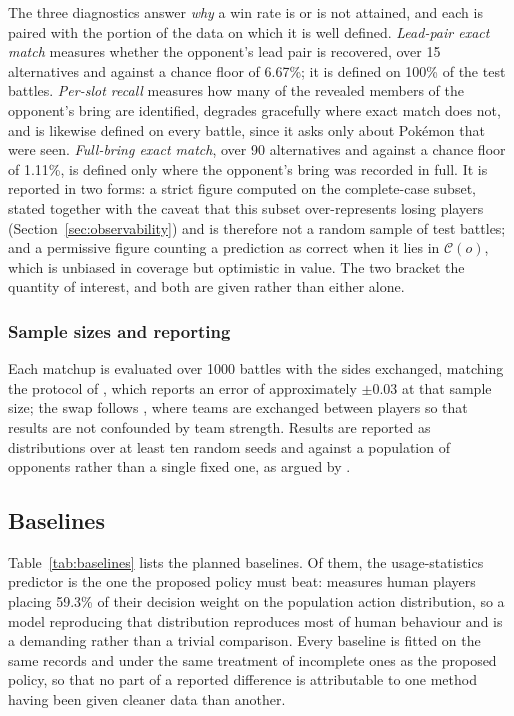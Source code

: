 \documentclass[conference]{IEEEtran}
\begin{document}
The three diagnostics answer \emph{why} a win rate is or is not attained, and
each is paired with the portion of the data on which it is well defined.
\emph{Lead-pair exact match} measures whether the opponent's lead pair is
recovered, over 15 alternatives and against a chance floor of 6.67\%; it is
defined on 100\% of the test battles. \emph{Per-slot recall} measures how many
of the revealed members of the opponent's bring are identified, degrades
gracefully where exact match does not, and is likewise defined on every battle,
since it asks only about Pok\'emon that were seen. \emph{Full-bring exact
match}, over 90 alternatives and against a chance floor of 1.11\%, is defined
only where the opponent's bring was recorded in full. It is reported in two
forms: a strict figure computed on the complete-case subset, stated together
with the caveat that this subset over-represents losing players
(Section~\ref{sec:observability}) and is therefore not a random sample of test
battles; and a permissive figure counting a prediction as correct when it lies
in $\mathcal{C}(o)$, which is unbiased in coverage but optimistic in value. The
two bracket the quantity of interest, and both are given rather than either
alone.

\subsubsection{Sample sizes and reporting} Each matchup is evaluated over 1000 battles
with the sides exchanged, matching the protocol of \cite{angliss2026}, which
reports an error of approximately $\pm 0.03$ at that sample size; the swap
follows \cite{reis2021}, where teams are exchanged between players so that
results are not confounded by team strength. Results are reported as
distributions over at least ten random seeds and against a population of
opponents rather than a single fixed one, as argued by \cite{liwellman2024}.

\subsection{Baselines}

Table~\ref{tab:baselines} lists the planned baselines. Of them, the
usage-statistics predictor is the one the proposed policy must beat:
\cite{oblander2025} measures human players placing 59.3\% of their decision
weight on the population action distribution, so a model reproducing that
distribution reproduces most of human behaviour and is a demanding rather than
a trivial comparison. Every baseline is fitted on the same records and under
the same treatment of incomplete ones as the proposed policy, so that no part
of a reported difference is attributable to one method having been given
cleaner data than another.
\end{document}
